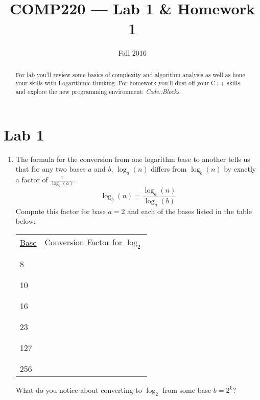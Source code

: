 \documentclass[10pt]{article}
\title{COMP220 --- Lab 1 \& Homework 1}
\author{ }
\date{Fall 2016}
\begin{document}
\maketitle
\thispagestyle{empty}

\begin{abstract}
  For lab you'll review some basics of complexity and algorithm analysis as well as hone your skills with Logarithmic thinking. For homework you'll dust off your C++ skills and explore the new programming environment: \textit{Code::Blocks}.
\end{abstract}

\section{Lab 1}

\begin{enumerate}
  \item The formula for the conversion from one logarithm base to another tells us that for any two bases $a$ and $b$, $\log_a(n)$ differs from $\log_b(n)$ by exactly a factor of $\frac{1}{\log_b(a)}$.
  \[
  \log_b(n) = \dfrac{\log_a(n)}{\log_a(b)}
  \]
  Compute this factor for base $a=2$ and each of the bases listed in the table below:

  \begin{center}
  \begin{tabular}{lc}
  \underline{Base} & \underline{Conversion Factor for $\log_2$} \\
     &  \\
     &  \\
  8  & \underline{\hspace{1.5in}} \\
     & \\
     &  \\
  10 & \underline{\hspace{1.5in}} \\
     & \\
     &  \\
  16 & \underline{\hspace{1.5in}} \\
     & \\
     &  \\
  23 & \underline{\hspace{1.5in}} \\
     & \\
     &  \\
  127 & \underline{\hspace{1.5in}} \\
   & \\
   &  \\
  256  & \underline{\hspace{1.5in}} \\
  \end{tabular}
  \end{center}
  What do you notice about converting to $\log_2$ from some base $b=2^k$?


\end{enumerate}
\end{document}
